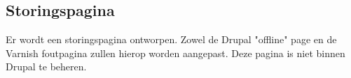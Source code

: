 \subsection{Storingspagina}\label{storingspagina}

Er wordt een storingspagina ontworpen. Zowel de Drupal "offline" page en de Varnish foutpagina zullen hierop worden aangepast. Deze pagina is niet binnen Drupal te beheren.
